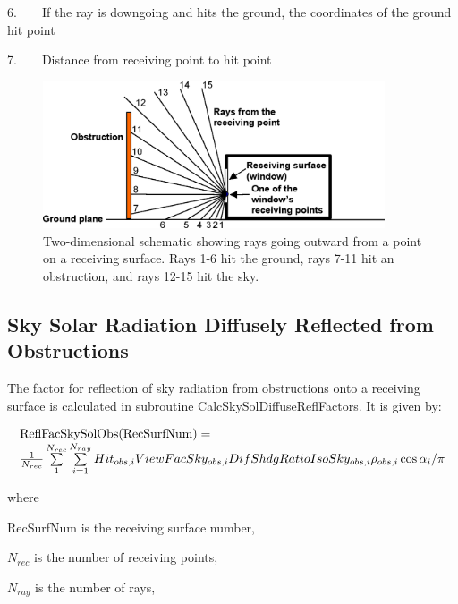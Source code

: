 6.~~~~If the ray is downgoing and hits the ground, the coordinates of the ground hit point

7.~~~~Distance from receiving point to hit point

\begin{figure}[hbtp] %
\centering
\includegraphics[width=0.9\textwidth, height=0.9\textheight, keepaspectratio=true]{media/image680.png}
\caption{  Two-dimensional schematic showing rays going outward from a point on a receiving surface. Rays 1-6 hit the ground, rays 7-11 hit an obstruction, and rays 12-15 hit the sky. \protect \label{fig:two-dimensional-schematic-showing-rays-going}}
\end{figure}

\subsection{Sky Solar Radiation Diffusely Reflected from Obstructions}\label{sky-solar-radiation-diffusely-reflected-from-obstructions}

The factor for reflection of sky radiation from obstructions onto a receiving surface is calculated in subroutine CalcSkySolDiffuseReflFactors. It is given by:

\begin{equation}
\begin{array}{l}{\rm{ReflFacSkySolObs(RecSurfNum)}} = \\\frac{1}{{{N_{rec}}}}\sum\limits_1^{{N_{rec}}} {\sum\limits_{i = 1}^{{N_{ray}}} {Hi{t_{obs,i}}ViewFacSk{y_{obs,i}}DifShdgRatioIsoSk{y_{obs,i}}{\rho_{obs,i}}\cos {\alpha_i}/\pi } } \end{array}
\end{equation}

where

RecSurfNum is the receiving surface number,

\({N_{rec}}\) is the number of receiving points,

\({N_{ray}}\) is the number of rays,

